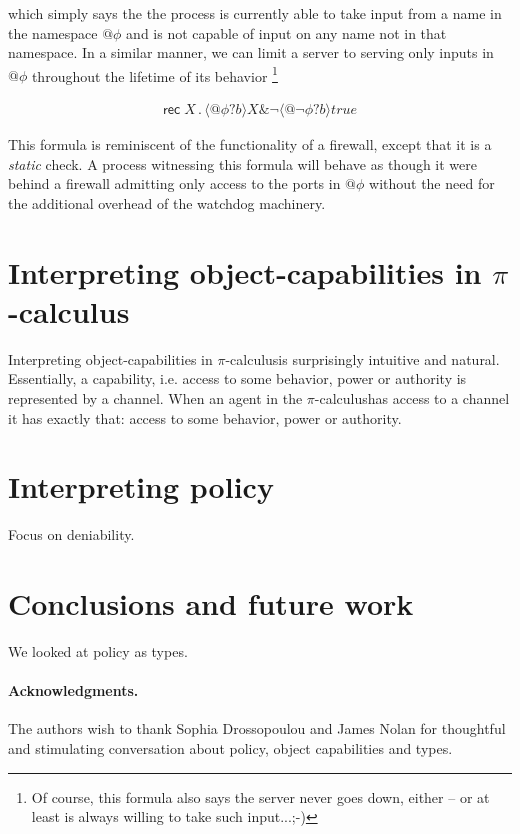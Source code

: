 \documentclass[]{amsart}
\makeatletter
\newcommand{\quotep}[1]{@#1}
\newcommand{\ptrue}{\mathbin{true}}
\newcommand{\pprefix}[3]{\langle #1 ? #2 \rangle #3}
\newcommand{\pgfp}[2]{\textsf{rec} \; #1 \mathbin{.} #2}
\theoremstyle{definition}
\theoremstyle{remark}
\numberwithin{equation}{subsection}
\newcommand{\pic}{$\pi$-calculus}
\makeatother
\begin{document}
which simply says the the process is currently able to take input from
a name in the namespace $\quotep{\phi}$ and is not capable of input on
any name not in that namespace. In a similar manner, we can limit a
server to serving only inputs in $\quotep{\phi}$ throughout the
lifetime of its behavior \footnote{Of course, this formula also says
  the server never goes down, either -- or at least is always willing
  to take such input...;-)}

\begin{eqnarray}
  \pgfp{X}{\pprefix{\quotep{\phi}}{b}{X} \& \neg \pprefix{\quotep{\neg \phi}}{b}{\ptrue}} \nonumber
\end{eqnarray} 

This formula is reminiscent of the functionality of a firewall, except
that it is a \emph{static} check. A process witnessing this formula
will behave as though it were behind a firewall admitting only access
to the ports in $\quotep{\phi}$ without the need for the additional
overhead of the watchdog machinery.

\section{Interpreting object-capabilities in \pic}

Interpreting object-capabilities in \pic is surprisingly intuitive and
natural. Essentially, a capability, i.e. access to some behavior,
power or authority is represented by a channel. When an agent in the
\pic has access to a channel it has exactly that: access to some
behavior, power or authority.

\section{Interpreting policy}

Focus on deniability.

\section{Conclusions and future work}

We looked at policy as types.

\paragraph{Acknowledgments.}
The authors wish to thank Sophia Drossopoulou and James Nolan for
thoughtful and stimulating conversation about policy, object
capabilities and types.





\end{document}
